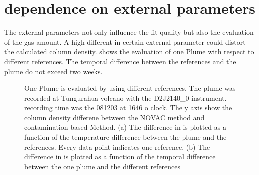 \documentclass  [
  paper    = a4,
  BCOR     = 10mm,
  twoside,
  fontsize = 12pt,
  fleqn,
  toc      = bibnumbered,
  toc      = listofnumbered,
  numbers  = noendperiod,
  headings = normal,
  listof   = leveldown,
  version  = 3.03
]                                       {scrreprt}
\begin{document}
	\section{  dependence on external parameters}
	The external parameters not only influence the fit quality but also the evaluation of the gas amount. A high different in certain external parameter could distort the calculated   column density.  shows the evaluation of one Plume with respect to different references. The temporal difference between the references and the plume do not exceed two weeks. 
	\begin{figure}
		\caption{One Plume is evaluated by using different references. The plume was recorded at Tungurahua volcano with the D2J2140\_0 instrument. recording time was the 081203 at 1646 o clock. The y axis show the   column density differene between the NOVAC method and contamination based Method. (a) The difference in   is plotted as a function of the temperature difference between the plume and the references. Every data point indicates one reference. (b) The difference in   is plotted as a function of the temporal difference between the one plume and the different references}
		\label{fig:d2j2140060218difftemperature-cbro}		
	\end{figure}
\end{document}
